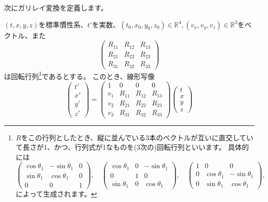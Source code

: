 次にガリレイ変換を定義します。
\begin{definition}[ガリレイ変換と慣性系]
  $(t,x,y,z)$を標準慣性系、$t'$を実数、$(t_0,x_0,y_0,z_0)\in\mathbb{R}^4, (v_x,v_y,v_z)\in\mathbb{R}^3$をベクトル、また
  \[
    \begin{pmatrix}
      R_{11} & R_{12} & R_{13} \\
      R_{21} & R_{22} & R_{23} \\
      R_{31} & R_{32} & R_{33}
    \end{pmatrix}
  \]
  は回転行列\footnote{
    $R$をこの行列としたとき、縦に並んでいる3本のベクトルが互いに直交していて長さが1、かつ、行列式が1なものを(3次の)回転行列といいます。
    具体的には
    \[
      \begin{pmatrix}
        \cos\theta_1 & -\sin\theta_1 & 0 \\
        \sin\theta_1 & \cos\theta_1 & 0 \\
        0 & 0 & 1
      \end{pmatrix},\quad
      \begin{pmatrix}
        \cos\theta_1 & 0 & -\sin\theta_1 \\
        0 & 1 & 0 \\
        \sin\theta_1 & 0 & \cos\theta_1
      \end{pmatrix},\quad
      \begin{pmatrix}
        1 & 0 & 0 \\
        0 & \cos\theta_1 & -\sin\theta_1 \\
        0 & \sin\theta_1 & \cos\theta_1
      \end{pmatrix},\quad
    \]
    によって生成されます。
  }であるとする。
  このとき、線形写像
  \[
    \begin{pmatrix}
      t'\\x'\\y'\\z'
    \end{pmatrix}
    =
    \begin{pmatrix}
      1 & 0 & 0 & 0 \\
      v_1 & R_{11} & R_{12} & R_{13} \\
      v_2 & R_{21} & R_{22} & R_{23} \\
      v_3 & R_{31} & R_{32} & R_{33}
    \end{pmatrix}
    \begin{pmatrix}
      t\\x\\y\\z
    \end{pmatrix}
\]
\end{definition}
